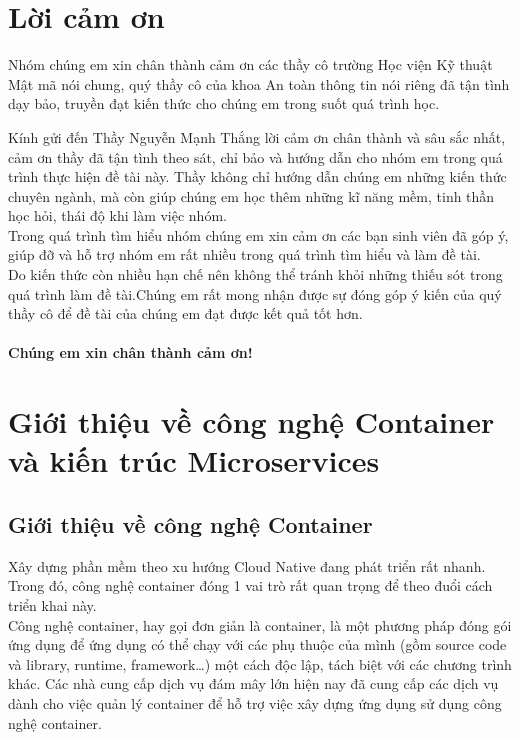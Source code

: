 \documentclass[14pt,a4paper]{book}
\begin{document}
\chapter*{\centering Lời cảm ơn}
\hspace{0.6cm}Nhóm chúng em xin chân thành cảm ơn các thầy cô trường Học viện Kỹ thuật Mật mã nói chung, quý thầy cô của khoa An toàn thông tin nói riêng đã tận tình dạy bảo, truyền đạt kiến thức cho chúng em trong suốt quá trình học.\newline

Kính gửi đến Thầy Nguyễn Mạnh Thắng lời cảm ơn chân thành và sâu sắc nhất, cảm ơn thầy đã tận tình theo sát, chỉ bảo và hướng dẫn cho nhóm em trong quá trình thực hiện đề tài này. Thầy không chỉ hướng dẫn chúng em những kiến thức chuyên ngành, mà còn giúp chúng em học thêm những kĩ năng mềm, tinh thần học hỏi, thái độ khi làm việc nhóm.\\

Trong quá trình tìm hiểu nhóm chúng em xin cảm ơn các bạn sinh viên đã góp ý, giúp đỡ và hỗ trợ nhóm em rất nhiều trong quá trình tìm hiểu và làm đề tài.\\

Do kiến thức còn nhiều hạn chế nên không thể tránh khỏi những thiếu sót trong quá trình làm đề tài.Chúng em rất mong nhận được sự đóng góp ý kiến của quý thầy cô để đề tài của chúng em đạt được kết quả tốt hơn.\\
\medskip \\
\textbf{Chúng em xin chân thành cảm ơn!}

\chapter{Giới thiệu về công nghệ Container và kiến trúc Microservices}
\setcounter{page}{1}
	\section{Giới thiệu về công nghệ Container}
		\smallskip
		\hspace{0.6cm}Xây dựng phần mềm theo xu hướng Cloud Native đang phát triển rất nhanh. Trong đó, công nghệ container đóng 1 vai trò rất quan trọng để theo đuổi cách triển khai này.\\
			
		Công nghệ container, hay gọi đơn giản là container, là một phương pháp đóng gói ứng dụng để ứng dụng có thể chạy với các phụ thuộc của mình (gồm source code và library, runtime, framework…) một cách độc lập, tách biệt với các chương trình khác. Các nhà cung cấp dịch vụ đám mây lớn hiện nay đã cung cấp các dịch vụ dành cho việc quản lý container để hỗ trợ việc xây dựng ứng dụng sử dụng công nghệ container.
\end{document}
